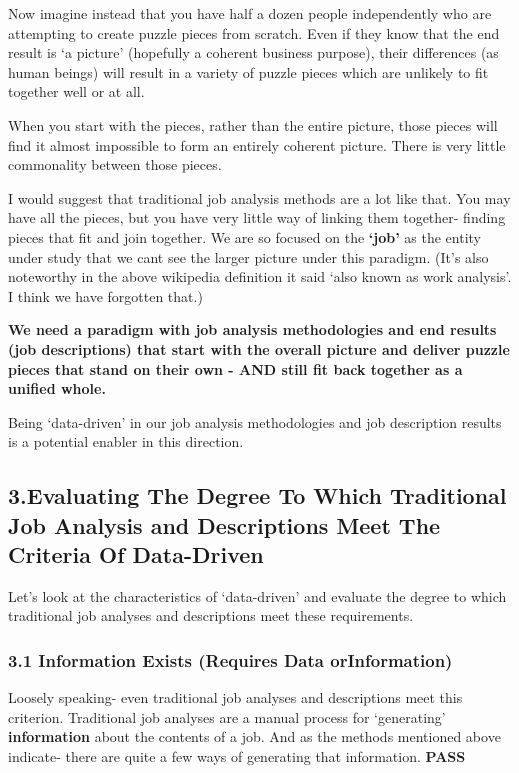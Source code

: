 \documentclass[12pt,letterpaper]{article}
\begin{document}
Now imagine instead that you have half a dozen people independently who
are attempting to create puzzle pieces from scratch. Even if they know
that the end result is `a picture' (hopefully a coherent business
purpose), their differences (as human beings) will result in a variety
of puzzle pieces which are unlikely to fit together well or at all.

When you start with the pieces, rather than the entire picture, those
pieces will find it almost impossible to form an entirely coherent
picture. There is very little commonality between those pieces.

I would suggest that traditional job analysis methods are a lot like
that. You may have all the pieces, but you have very little way of
linking them together- finding pieces that fit and join together. We are
so focused on the \textbf{`job'} as the entity under study that we cant
see the larger picture under this paradigm. (It's also noteworthy in the
above wikipedia definition it said `also known as work analysis'. I
think we have forgotten that.)

\textbf{We need a paradigm with job analysis methodologies and end
results (job descriptions) that start with the overall picture and
deliver puzzle pieces that stand on their own - AND still fit back
together as a unified whole.}

Being `data-driven' in our job analysis methodologies and job
description results is a potential enabler in this direction.



\subsection{3.Evaluating The Degree To Which Traditional Job Analysis
and Descriptions Meet The Criteria Of Data-Driven}

Let's look at the characteristics of `data-driven' and evaluate the
degree to which traditional job analyses and descriptions meet these
requirements.

\subsubsection{\textbf{3.1 Information Exists (Requires
Data orInformation)}}

Loosely speaking- even traditional job analyses and descriptions meet
this criterion. Traditional job analyses are a manual process for
`generating' \textbf{information} about the contents of a job. And as
the methods mentioned above indicate- there are quite a few ways of
generating that information. \textbf{PASS}
\end{document}

